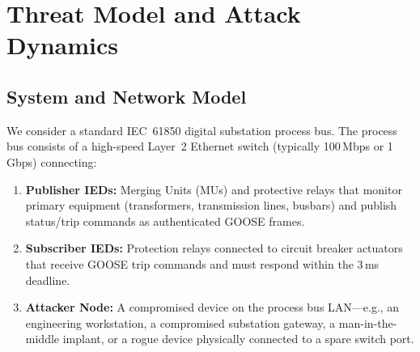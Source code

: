 \documentclass{ieeeaccess}
\begin{document}
\section{Threat Model and Attack Dynamics}

\subsection{System and Network Model}
We consider a standard IEC~61850 digital substation process bus. The process bus consists of a high-speed Layer~2 Ethernet switch (typically 100\,Mbps or 1\,Gbps) connecting:
\begin{enumerate}[leftmargin=*]
    \item \textbf{Publisher IEDs:} Merging Units (MUs) and protective relays that monitor primary equipment (transformers, transmission lines, busbars) and publish status/trip commands as authenticated GOOSE frames.
    \item \textbf{Subscriber IEDs:} Protection relays connected to circuit breaker actuators that receive GOOSE trip commands and must respond within the 3\,ms deadline.
    \item \textbf{Attacker Node:} A compromised device on the process bus LAN---e.g., an engineering workstation, a compromised substation gateway, a man-in-the-middle implant, or a rogue device physically connected to a spare switch port.
\end{enumerate}
\end{document}
